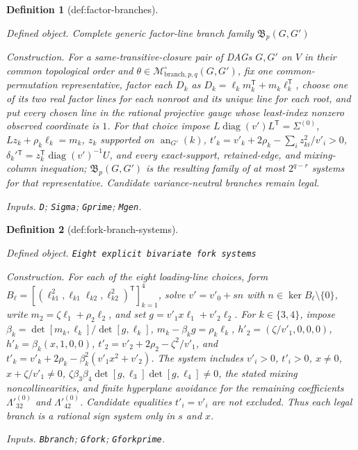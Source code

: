 \documentclass{article}
\newtheorem{definition}{Definition}
\begin{document}
\begin{definition}[def:factor-branches]\label{def:factor-branches}
\par\smallskip\noindent\emph{Defined object.} Complete generic factor-line branch family \(\mathfrak B_p(G,G')\)
\par\smallskip\noindent\emph{Construction.} For a same-transitive-closure pair of DAGs \(G,G'\) on \(V\) in their common topological order and \(\theta\in\mathcal M^{\circ}_{\mathrm{branch},p,q}(G,G')\), fix one common-permutation representative, factor each \(D_k\) as \(D_k=\ell_km_k^{\mathsf T}+m_k\ell_k^{\mathsf T}\), choose one of its two real factor lines for each nonroot and its unique line for each root, and put every chosen line in the rational projective gauge whose least-index nonzero observed coordinate is \(1\). For that choice impose \(L\operatorname{diag}(v')L^{\mathsf T}=\Sigma^{(0)}\), \(Lz_k+\rho_k\ell_k=m_k\), \(z_k\) supported on \(\operatorname{an}_{G'}(k)\), \(t'_k=v'_k+2\rho_k-\sum_i z_{ki}^2/v'_i>0\), \(\delta_k'{}^{\mathsf T}=z_k^{\mathsf T}\operatorname{diag}(v')^{-1}U\), and every exact-support, retained-edge, and mixing-column inequation; \(\mathfrak B_p(G,G')\) is the resulting family of at most \(2^{q-r}\) systems for that representative. Candidate variance-neutral branches remain legal.
\par\smallskip\noindent\emph{Inputs.} \texttt{D}; \texttt{Sigma}; \texttt{Gprime}; \texttt{Mgen}.
\end{definition}

\begin{definition}[def:fork-branch-systems]\label{def:fork-branch-systems}
\par\smallskip\noindent\emph{Defined object.} \texttt{Eight explicit bivariate fork systems}
\par\smallskip\noindent\emph{Construction.} For each of the eight loading-line choices, form \(B_{\ell}=[(\ell_{k1}^2,\ell_{k1}\ell_{k2},\ell_{k2}^2)^{\mathsf T}]_{k=1}^{4}\), solve \(v'=v'_0+sn\) with \(n\in\ker B_{\ell}\setminus\{0\}\), write \(m_2=\zeta\ell_1+\rho_2\ell_2\), and set \(g=v'_1x\ell_1+v'_2\ell_2\). For \(k\in\{3,4\}\), impose \(\beta_k=\det[m_k,\ell_k]/\det[g,\ell_k]\), \(m_k-\beta_kg=\rho_k\ell_k\), \(h'_2=(\zeta/v'_1,0,0,0)\), \(h'_k=\beta_k(x,1,0,0)\), \(t'_2=v'_2+2\rho_2-\zeta^2/v'_1\), and \(t'_k=v'_k+2\rho_k-\beta_k^2(v'_1x^2+v'_2)\). The system includes \(v'_i>0\), \(t'_i>0\), \(x\ne0\), \(x+\zeta/v'_1\ne0\), \(\zeta\beta_3\beta_4\det[g,\ell_3]\det[g,\ell_4]\ne0\), the stated mixing noncollinearities, and finite hyperplane avoidance for the remaining coefficients \(\Lambda'^{(0)}_{32}\) and \(\Lambda'^{(0)}_{42}\). Candidate equalities \(t'_i=v'_i\) are not excluded. Thus each legal branch is a rational sign system only in \(s\) and \(x\).
\par\smallskip\noindent\emph{Inputs.} \texttt{Bbranch}; \texttt{Gfork}; \texttt{Gforkprime}.
\end{definition}
\end{document}
